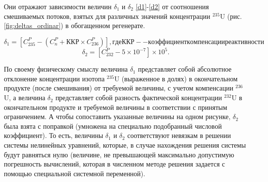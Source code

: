 Они отражают зависимости величин $\delta_1$ и $\delta_2$ \ref{d1}-\ref{d2} от соотношения смешиваемых потоков, взятых для различных значений концентрации $^{235}$U (рис. \ref{fig:deltas_ordinar}) в обогащенном регенерате.

\begin{equation} \label{d1} 
  \delta_1=\left[C_{235}^P-\left(C_n^P+ККР\times C_{236}^P\right)\right], где ККР -- коэффициент компенсации реактивности
  \end{equation} 
  \begin{equation} \label{d2} 
    \delta_2=\left[C_{232}^P-5\times10^{-7}\right]\times10^5.             
\end{equation}

По своему физическому смыслу величина $\delta_1$ представляет собой абсолютное отклонение концентрации изотопа $^{235}$U (выраженное в долях) в окончательном продукте (после смешивания) от требуемой величины, с учетом компенсации $^{236}$U, а величина $\delta_2$ представляет собой разность фактической концентрации $^{232}$U в окончательном продукте и требуемой величины в соответствии с принятым ограничением. А чтобы сопоставить указанные величины на одном рисунке, $\delta_2$ была взята с поправкой (умножена на специально подобранный числовой коэффициент). То есть, величины $\delta_1$ и $\delta_2$ соответствуют невязкам в решении системы нелинейных уравнений, которые, в случае нахождения решения системы будут равняться нулю (величине, не превышающей максимально допустимую погрешность вычислений, которая в численном методе решения задается с помощью специальной системной переменной).


